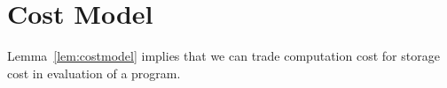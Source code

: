 \section{Cost Model}

Lemma~\ref{lem:costmodel} implies that we can trade computation cost for
storage cost in evaluation of a \slang program. 






